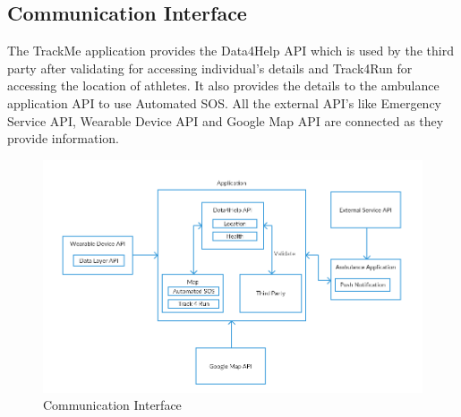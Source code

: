 \subsection{Communication Interface}
The TrackMe application provides the Data4Help API which is used by the third party after validating for accessing individual's details and Track4Run for accessing the location of athletes. It also provides the details to the ambulance application API to use Automated SOS. All the external API's like Emergency Service API, Wearable Device API and Google Map API are connected as they provide information.
\begin{figure}[H]
	\centering	
		\includegraphics[width=\linewidth]		{./Diagrams/CommunicationInterface.png}
      	\caption{Communication Interface}
        \label{TrackMe_comint}
\end{figure}